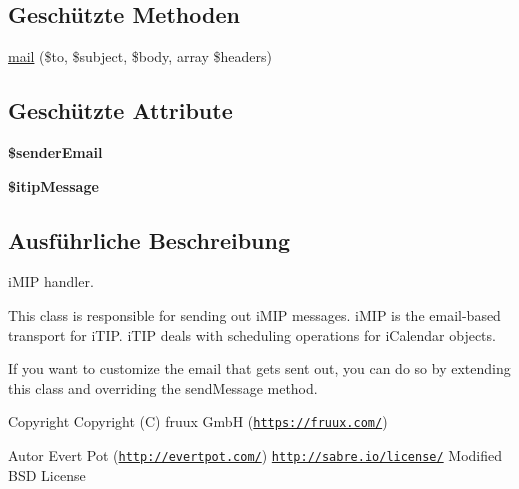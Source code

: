 \subsection*{Geschützte Methoden}
\begin{DoxyCompactItemize}
\item 
\mbox{\hyperlink{class_sabre_1_1_cal_d_a_v_1_1_schedule_1_1_i_mip_plugin_a91e0bf21999c2b70d183e274c023b792}{mail}} (\$to, \$subject, \$body, array \$headers)
\end{DoxyCompactItemize}
\subsection*{Geschützte Attribute}
\begin{DoxyCompactItemize}
\item 
\mbox{\label{class_sabre_1_1_cal_d_a_v_1_1_schedule_1_1_i_mip_plugin_a295f8b43b0144a828677b6fabcebd415}} 
{\bfseries \$sender\+Email}
\item 
\mbox{\label{class_sabre_1_1_cal_d_a_v_1_1_schedule_1_1_i_mip_plugin_a717f5f59ad6251efe12b15ce5e4a670a}} 
{\bfseries \$itip\+Message}
\end{DoxyCompactItemize}


\subsection{Ausführliche Beschreibung}
i\+M\+IP handler.

This class is responsible for sending out i\+M\+IP messages. i\+M\+IP is the email-\/based transport for i\+T\+IP. i\+T\+IP deals with scheduling operations for i\+Calendar objects.

If you want to customize the email that gets sent out, you can do so by extending this class and overriding the send\+Message method.

\begin{DoxyCopyright}{Copyright}
Copyright (C) fruux GmbH (\href{https://fruux.com/}{\tt https\+://fruux.\+com/}) 
\end{DoxyCopyright}
\begin{DoxyAuthor}{Autor}
Evert Pot (\href{http://evertpot.com/}{\tt http\+://evertpot.\+com/})  \href{http://sabre.io/license/}{\tt http\+://sabre.\+io/license/} Modified B\+SD License 
\end{DoxyAuthor}


